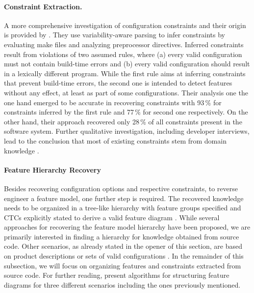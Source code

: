 \paragraph{Constraint Extraction.} 
A more comprehensive investigation of configuration
constraints and their origin is provided by \cite{nadi_mining_2014,nadi_where_2015}. They use variability-aware parsing to infer constraints by
evaluating make files and  analyzing preprocessor directives. Inferred
constraints result from violations of two assumed rules, where (a) every valid
configuration must not contain build-time errors and (b) every valid
configuration should result in a lexically different program. While the
first rule aims at inferring constraints that prevent build-time errors, the
second one is intended to detect features without any effect, at least as part
of some configurations. Their analysis one the one hand emerged to be accurate
in recovering constraints with 93\,\% for constraints inferred by the first rule
and 77\,\% for second one respectively. On the other hand, their approach
recovered only 28\,\% of all constraints present in the software system.
Further qualitative investigation, including developer interviews, lead to
the conclusion that most of existing constraints stem from domain knowledge
\citep{nadi_where_2015}.

\paragraph{Feature Hierarchy Recovery} \label{sec:feature_hierarchy}
Besides recovering configuration options and respective constraints, to reverse
engineer a feature model, one further step is required. The recovered knowledge
needs to be organized in a tree-like hierarchy with feature groups specified and
CTCs explicitly stated to derive a valid feature diagram 
\citep{kang_feature-oriented_1990}.
While several approaches for recovering the feature model hierarchy have been
proposed, we are primarily interested in finding a hierarchy for knowledge
obtained from source code. Other scenarios, as already stated in the opener of
this section, are based on product descriptions or sets of valid configurations
\citep{aleti_software_2013,bakar_feature_2015}. In the remainder of this
subsection, we will focus on organizing features and constraints extracted from
source code. For further reading, \cite{andersen_efficient_2012} present algorithms for structuring feature diagrams for three different scenarios including the ones previously mentioned.

